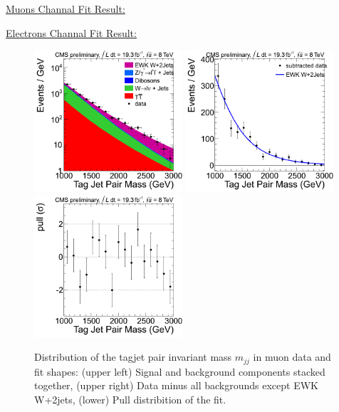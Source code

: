 \underline{Muons Channal Fit Result:}
{\tiny

}

\underline{Electrons Channal Fit Result:}
{\tiny

}

\begin{figure}[h!]
  {\centering
    \includegraphics[width=0.49\textwidth]{figs/mjjfit/EWKW2jetstagjetmjj_defaultfit_muon_Stacked.png}
    \includegraphics[width=0.49\textwidth]{figs/mjjfit/EWKW2jetstagjetmjj_defaultfit_muon_Subtracted.png}
    \includegraphics[width=0.49\textwidth]{figs/mjjfit/EWKW2jetstagjetmjj_defaultfit_muon_Pull.png}
    \caption{Distribution of the tagjet pair invariant mass $m_{jj}$ in muon data and fit shapes: 
      (upper left) Signal and background components stacked together, 
      (upper right) Data minus all backgrounds except EWK W+2jets,  
      (lower) Pull distribition of the fit.}
    \label{fig:mjj_2jet_mu}}
\end{figure}
